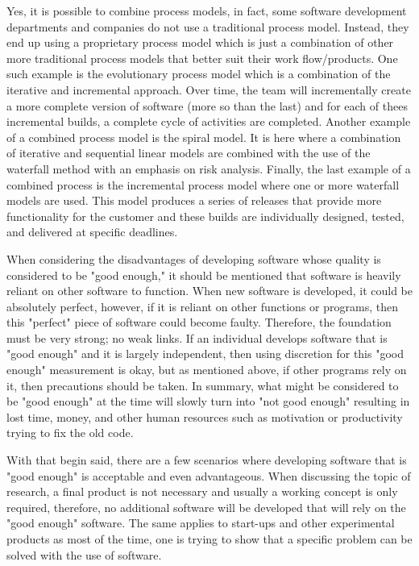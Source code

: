 	Yes, it is possible to combine process models, in fact, some software development departments and companies do not use a traditional process model. Instead, they end up using a proprietary process model which is just a combination of other more traditional process models that better suit their work flow/products. One such example is the evolutionary process model which is a combination of the iterative and incremental approach. Over time, the team will incrementally create a more complete version of software (more so than the last) and for each of thees incremental builds, a complete cycle of activities are completed. Another example of a combined process model is the spiral model. It is here where a combination of iterative and sequential linear models are combined with the use of the waterfall method with an emphasis on risk analysis. Finally, the last example of a combined process is the incremental process model where one or more waterfall models are used. This model produces a series of releases that provide more functionality for the customer and these builds are individually designed, tested, and delivered at specific deadlines.


\newpage
	When considering the disadvantages of developing software whose quality is considered to be "good enough," it should be mentioned that software is heavily reliant on other software to function. When new software is developed, it could be absolutely perfect, however, if it is reliant on other functions or programs, then this "perfect" piece of software could become faulty. Therefore, the foundation must be very strong; no weak links. If an individual develops software that is "good enough" and it is largely independent, then using discretion for this "good enough" measurement is okay, but as mentioned above, if other programs rely on it, then precautions should be taken. In summary, what might be considered to be "good enough" at the time will slowly turn into "not good enough" resulting in lost time, money, and other human resources such as motivation or productivity trying to fix the old code.

	With that begin said, there are a few scenarios where developing software that is "good enough" is acceptable and even advantageous. When discussing the topic of research, a final product is not necessary and usually a working concept is only required, therefore, no additional software will be developed that will rely on the "good enough" software. The same applies to start-ups and other experimental products as most of the time, one is trying to show that a specific problem can be solved with the use of software.


